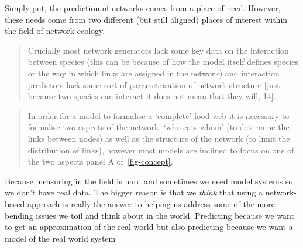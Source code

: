 \documentclass[
]{article}
\begin{document}
Simply put, the prediction of networks comes from a place of need.
However, these needs come from two different (but still aligned) places
of interest within the field of network ecology.

\begin{quote}
Crucially most network generators lack some key data on the interaction
between species (this can be because of how the model itself defines
species or the way in which links are assigned in the network) and
interaction predictors lack some sort of parametrisation of network
structure {[}just because two species can interact it does not mean that
they will, 14{]}.
\end{quote}

\begin{quote}
In order for a model to formalise a `complete' food web it is necessary
to formalise two aspects of the network, `who eats whom' (to determine
the links between nodes) as well as the structure of the network (to
limit the distribution of links), however most models are inclined to
focus on one of the two aspects panel A of~\ref{fig-concept}.
\end{quote}

Because measuring in the field is hard and sometimes we need model
systems so we don't have real data. The bigger reason is that we
\emph{think} that using a network-based approach is really the answer to
helping us address some of the more bending issues we toil and think
about in the world. Predicting because we want to get an approximation
of the real world but also predicting because we want a model of the
real world system
\end{document}
